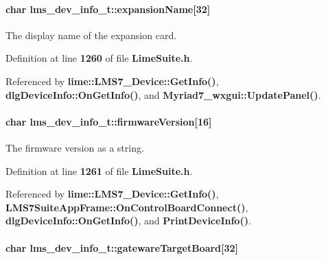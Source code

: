 \paragraph[{expansion\+Name}]{\setlength{\rightskip}{0pt plus 5cm}char lms\+\_\+dev\+\_\+info\+\_\+t\+::expansion\+Name[32]}\label{structlms__dev__info__t_a776d57f238f890612ec35c105a0e407c}


The display name of the expansion card. 



Definition at line {\bf 1260} of file {\bf Lime\+Suite.\+h}.



Referenced by {\bf lime\+::\+L\+M\+S7\+\_\+\+Device\+::\+Get\+Info()}, {\bf dlg\+Device\+Info\+::\+On\+Get\+Info()}, and {\bf Myriad7\+\_\+wxgui\+::\+Update\+Panel()}.

\paragraph[{firmware\+Version}]{\setlength{\rightskip}{0pt plus 5cm}char lms\+\_\+dev\+\_\+info\+\_\+t\+::firmware\+Version[16]}\label{structlms__dev__info__t_ac3653c9c7a75c828771532f117a31c34}


The firmware version as a string. 



Definition at line {\bf 1261} of file {\bf Lime\+Suite.\+h}.



Referenced by {\bf lime\+::\+L\+M\+S7\+\_\+\+Device\+::\+Get\+Info()}, {\bf L\+M\+S7\+Suite\+App\+Frame\+::\+On\+Control\+Board\+Connect()}, {\bf dlg\+Device\+Info\+::\+On\+Get\+Info()}, and {\bf Print\+Device\+Info()}.

\paragraph[{gateware\+Target\+Board}]{\setlength{\rightskip}{0pt plus 5cm}char lms\+\_\+dev\+\_\+info\+\_\+t\+::gateware\+Target\+Board[32]}\label{structlms__dev__info__t_a21425c6c819f663c25932e506512c031}


